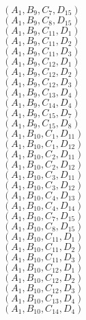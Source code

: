 \documentclass[14pt]{article}
\begin{document}
    $({A}_{1}, {B}_{9}, {C}_{7}, {D}_{15}) $ \\ 
    $({A}_{1}, {B}_{9}, {C}_{8}, {D}_{15}) $ \\ 
    $({A}_{1}, {B}_{9}, {C}_{11}, {D}_{1}) $ \\ 
    $({A}_{1}, {B}_{9}, {C}_{11}, {D}_{2}) $ \\ 
    $({A}_{1}, {B}_{9}, {C}_{11}, {D}_{3}) $ \\ 
    $({A}_{1}, {B}_{9}, {C}_{12}, {D}_{1}) $ \\ 
    $({A}_{1}, {B}_{9}, {C}_{12}, {D}_{2}) $ \\ 
    $({A}_{1}, {B}_{9}, {C}_{12}, {D}_{3}) $ \\ 
    $({A}_{1}, {B}_{9}, {C}_{13}, {D}_{4}) $ \\ 
    $({A}_{1}, {B}_{9}, {C}_{14}, {D}_{4}) $ \\ 
    $({A}_{1}, {B}_{9}, {C}_{15}, {D}_{7}) $ \\ 
    $({A}_{1}, {B}_{9}, {C}_{15}, {D}_{8}) $ \\ 
    $({A}_{1}, {B}_{10}, {C}_{1}, {D}_{11}) $ \\ 
    $({A}_{1}, {B}_{10}, {C}_{1}, {D}_{12}) $ \\ 
    $({A}_{1}, {B}_{10}, {C}_{2}, {D}_{11}) $ \\ 
    $({A}_{1}, {B}_{10}, {C}_{2}, {D}_{12}) $ \\ 
    $({A}_{1}, {B}_{10}, {C}_{3}, {D}_{11}) $ \\ 
    $({A}_{1}, {B}_{10}, {C}_{3}, {D}_{12}) $ \\ 
    $({A}_{1}, {B}_{10}, {C}_{4}, {D}_{13}) $ \\ 
    $({A}_{1}, {B}_{10}, {C}_{4}, {D}_{14}) $ \\ 
    $({A}_{1}, {B}_{10}, {C}_{7}, {D}_{15}) $ \\ 
    $({A}_{1}, {B}_{10}, {C}_{8}, {D}_{15}) $ \\ 
    $({A}_{1}, {B}_{10}, {C}_{11}, {D}_{1}) $ \\ 
    $({A}_{1}, {B}_{10}, {C}_{11}, {D}_{2}) $ \\ 
    $({A}_{1}, {B}_{10}, {C}_{11}, {D}_{3}) $ \\ 
    $({A}_{1}, {B}_{10}, {C}_{12}, {D}_{1}) $ \\ 
    $({A}_{1}, {B}_{10}, {C}_{12}, {D}_{2}) $ \\ 
    $({A}_{1}, {B}_{10}, {C}_{12}, {D}_{3}) $ \\ 
    $({A}_{1}, {B}_{10}, {C}_{13}, {D}_{4}) $ \\ 
    $({A}_{1}, {B}_{10}, {C}_{14}, {D}_{4}) $ \\ 
\end{document}
